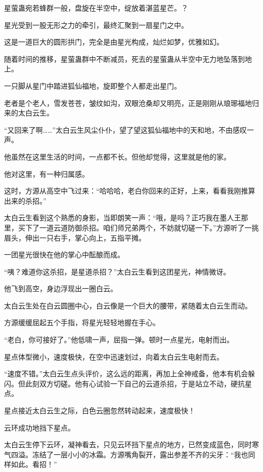 
\begin{this_body}

星萤蛊宛若蜂群一般，盘旋在半空中，绽放着湛蓝星芒。？

星光受到一股无形之力的牵引，最终汇聚到一扇星门之中。

这是一道巨大的圆形拱门，完全是由星光构成，灿烂如梦，优雅如幻。

随着时间的推移，星萤蛊群中不断减员，死去的星萤蛊从半空中无力地坠落到地上。

一只脚从星门中踏进狐仙福地，旋即整个人都走出星门。

老者是个老人，雪发苍苍，皱纹如沟，双眼沧桑却又明亮，正是刚刚从琅琊福地归来的太白云生。

“又回来了啊……”太白云生风尘仆仆，望了望这狐仙福地中的天和地，不由感叹一声。

他虽然在这里生活的时间，一点都不长。但他却觉得，这里就是他的家。

他对这里，有一种归属感。

这时，方源从高空中飞过来：“哈哈哈，老白你回来的正好，上来，看看我刚推算出来的杀招。”

太白云生看到这个熟悉的身影，当即朗笑一声：“哦，是吗？正巧我在墨人王那里，买下了一道云道防御杀招。咱们师兄弟两个，不妨就切磋一下。”方源听了一挑眉头，伸出一只右手，掌心向上，五指平摊。

一团星光很快在他的掌心中酝酿而成。

“咦？难道你这杀招，是星道杀招？”太白云生看到这团星光，神情微讶。

他飞到高空，身边浮现出一圈白云。

太白云生处在白云圆圈中心，白云像是一个巨大的腰带，紧随着太白云生而动。

方源缓缓屈起五个手指，将星光轻轻地握在手心。

“老白，你可接好了。”他低啸一声，屈指一弹。顿时一点星光，电射而出。

星点体型微小，速度极快，在空中迅速划过，向着太白云生电射而去。

“速度不错。”太白云生点头评价，这么远的距离，再加上全神戒备，他本有机会躲闪。但此刻双方切磋。他有心试验一下自己的云道杀招，于是站立不动，硬抗星点。

星点接近太白云生之际，白色云圈忽然转动起来，速度极快！

云环成功地挡下星点。

太白云生停下云环，凝神看去，只见云环挡下星点的地方，已然变成蓝色，同时寒气四溢。冻结了一层小小的冰霜。方源嘴角裂开，露出参差不齐的尖牙：“我也同样如此。看招！”


\end{this_body}
